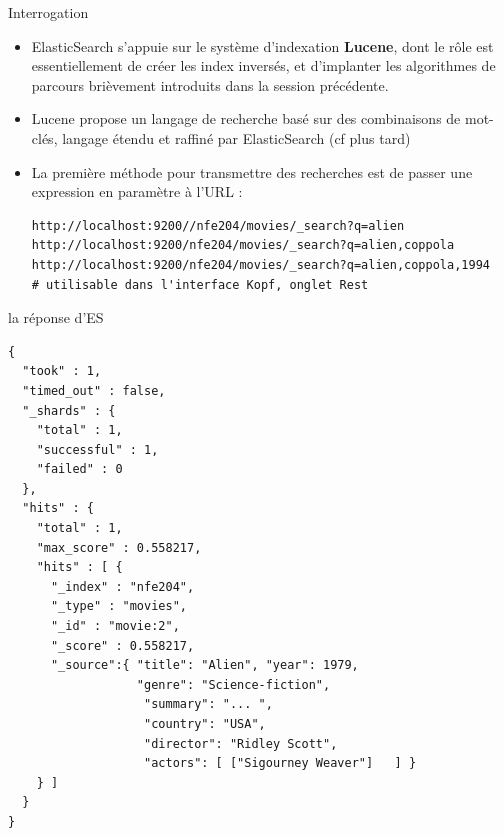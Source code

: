   


\begin{frame}[fragile]{Interrogation}
  \begin{itemize}
    \item ElasticSearch s’appuie sur le système d’indexation \textbf{Lucene},
      dont le rôle est essentiellement de créer les index inversés, et
      d’implanter les algorithmes de parcours brièvement introduits dans la
      session précédente. 

\item Lucene propose un langage de recherche basé sur des combinaisons de
  mot-clés, langage étendu et raffiné par ElasticSearch (cf plus tard)
\item La première méthode pour transmettre des recherches est de passer une
  expression en paramètre à l’URL :
\begin{verbatim}
http://localhost:9200//nfe204/movies/_search?q=alien
http://localhost:9200/nfe204/movies/_search?q=alien,coppola
http://localhost:9200/nfe204/movies/_search?q=alien,coppola,1994
# utilisable dans l'interface Kopf, onglet Rest
\end{verbatim}

\end{itemize}
\end{frame}

\begin{frame}[fragile]{la réponse d'ES}
	\begin{verbatim}
{
  "took" : 1,
  "timed_out" : false,
  "_shards" : {
    "total" : 1,
    "successful" : 1,
    "failed" : 0
  },
  "hits" : {
    "total" : 1,
    "max_score" : 0.558217,
    "hits" : [ {
      "_index" : "nfe204",
      "_type" : "movies",
      "_id" : "movie:2",
      "_score" : 0.558217,
      "_source":{ "title": "Alien", "year": 1979, 
                  "genre": "Science-fiction",
                   "summary": "... ", 
                   "country": "USA", 
                   "director": "Ridley Scott", 
                   "actors": [ ["Sigourney Weaver"]   ] }
    } ]
  }
}

\end{verbatim} 
\end{frame} 


